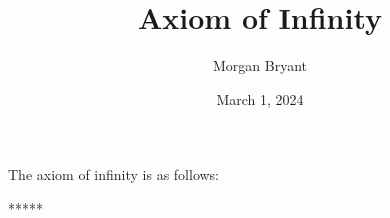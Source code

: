 \documentclass[a4paper]{article}
\title{Axiom of Infinity}
\date{March 1, 2024}
\author{Morgan Bryant}
\begin{document}
\maketitle
\par{The axiom of infinity is as follows:}\par{*****}
\printbibliography
\end{document}
